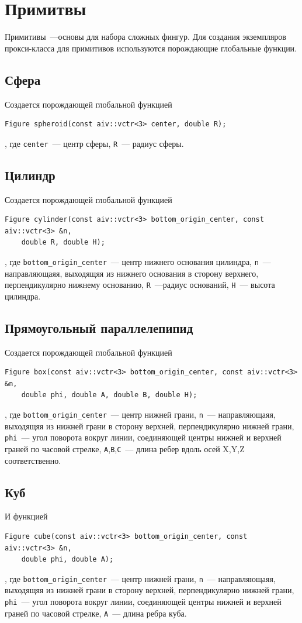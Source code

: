 \section{Примитвы}
Примитивы~---основы для набора сложных фингур. Для создания экземпляров прокси-класса для примитивов используются порождающие глобальные функции.

\subsection{Сфера}
Создается порождающей глобальной функцией
\begin{verbatim}
Figure spheroid(const aiv::vctr<3> center, double R);
\end{verbatim}
, где \verb"center"~--- центр сферы, \verb"R"~--- радиус сферы.

\subsection{Цилиндр}
Создается порождающей глобальной функцией
\begin{verbatim}
Figure cylinder(const aiv::vctr<3> bottom_origin_center, const aiv::vctr<3> &n, 
    double R, double H);
\end{verbatim}
, где \verb"bottom_origin_center"~--- центр нижнего основания цилиндра, \verb"n"~--- направляющаяя, выходящяя из нижнего основания в сторону верхнего, перпендикулярно нижнему основанию, \verb"R"~---радиус оснований, \verb"H"~--- высота цилиндра.

\subsection{Прямоугольный параллелепипид}
Создается порождающей глобальной функцией
\begin{verbatim}
Figure box(const aiv::vctr<3> bottom_origin_center, const aiv::vctr<3> &n, 
    double phi, double A, double B, double H);
\end{verbatim}
, где \verb"bottom_origin_center"~--- центр нижней грани, \verb"n"~--- направляющаяя, выходящяя из нижней грани в сторону верхней, перпендикулярно нижней грани, \verb"phi"~--- угол поворота вокруг линии, соединяющей центры нижней и верхней граней по часовой стрелке, \verb"A",\verb"B",\verb"C"~--- длина ребер вдоль осей X,Y,Z соответственно.

\subsection{Куб}
И функцией
\begin{verbatim}
Figure cube(const aiv::vctr<3> bottom_origin_center, const aiv::vctr<3> &n, 
    double phi, double A);
\end{verbatim}
, где \verb"bottom_origin_center"~--- центр нижней грани, \verb"n"~--- направляющаяя, выходящяя из нижней грани в сторону верхней, перпендикулярно нижней грани, \verb"phi"~--- угол поворота вокруг линии, соединяющей центры нижней и верхней граней по часовой стрелке, \verb"A"~--- длина ребра куба.

